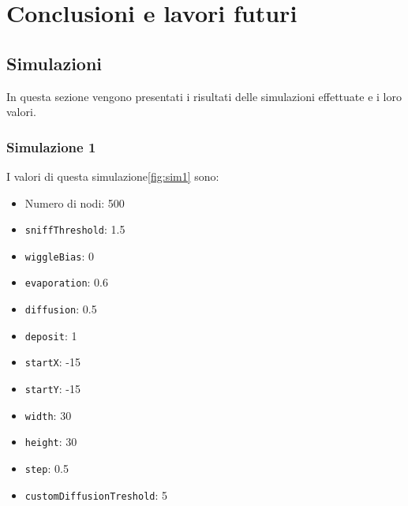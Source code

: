 \chapter{Conclusioni e lavori futuri}
\section{Simulazioni}
In questa sezione vengono presentati i risultati delle simulazioni effettuate e i loro valori.
\subsection{Simulazione 1}\label{sim1}
I valori di questa simulazione\space \cref{fig:sim1} sono:
\begin{itemize}
    \item Numero di nodi: 500
    \item \texttt{sniffThreshold}: 1.5
    \item \texttt{wiggleBias}: 0
    \item \texttt{evaporation}: 0.6
    \item \texttt{diffusion}: 0.5
    \item \texttt{deposit}: 1
    \item \texttt{startX}: -15
    \item \texttt{startY}: -15
    \item \texttt{width}: 30
    \item \texttt{height}: 30
    \item \texttt{step}: 0.5
    \item \texttt{customDiffusionTreshold}: 5
\end{itemize}
